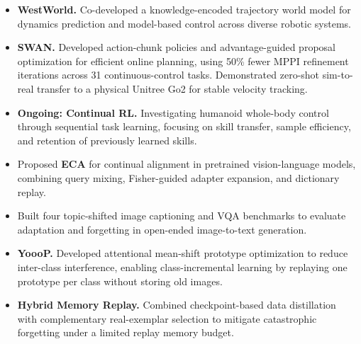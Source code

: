 \documentclass{resume}
\begin{document}
\begin{itemize}[parsep=0.35ex]
  \item \textbf{WestWorld.} Co-developed a knowledge-encoded trajectory world model for dynamics prediction and model-based control across diverse robotic systems.
  \item \textbf{SWAN.} Developed action-chunk policies and advantage-guided proposal optimization for efficient online planning, using 50\% fewer MPPI refinement iterations across 31 continuous-control tasks. Demonstrated zero-shot sim-to-real transfer to a physical Unitree Go2 for stable velocity tracking.
  \item \textbf{Ongoing: Continual RL.} Investigating humanoid whole-body control through sequential task learning, focusing on skill transfer, sample efficiency, and retention of previously learned skills.
\end{itemize}

\begin{itemize}[parsep=0.35ex]
  \item Proposed \textbf{ECA} for continual alignment in pretrained vision-language models, combining query mixing, Fisher-guided adapter expansion, and dictionary replay.
  \item Built four topic-shifted image captioning and VQA benchmarks to evaluate adaptation and forgetting in open-ended image-to-text generation.
\end{itemize}

\begin{itemize}[parsep=0.35ex]
  \item \textbf{YoooP.} Developed attentional mean-shift prototype optimization to reduce inter-class interference, enabling class-incremental learning by replaying one prototype per class without storing old images.
  \item \textbf{Hybrid Memory Replay.} Combined checkpoint-based data distillation with complementary real-exemplar selection to mitigate catastrophic forgetting under a limited replay memory budget.
\end{itemize}
\endgroup
\end{document}
